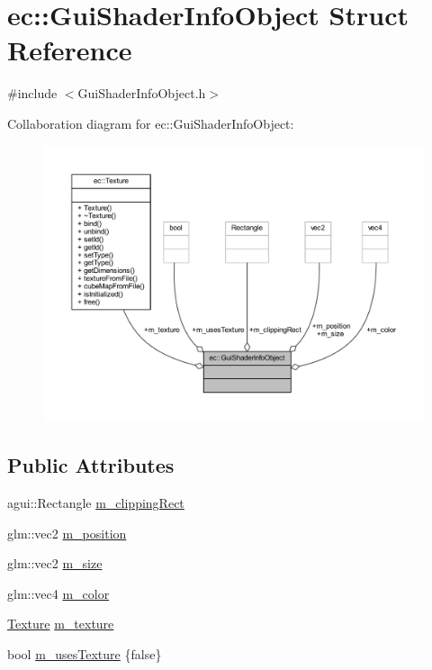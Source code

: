 \hypertarget{structec_1_1_gui_shader_info_object}{}\section{ec\+:\+:Gui\+Shader\+Info\+Object Struct Reference}
\label{structec_1_1_gui_shader_info_object}


{\ttfamily \#include $<$Gui\+Shader\+Info\+Object.\+h$>$}



Collaboration diagram for ec\+:\+:Gui\+Shader\+Info\+Object\+:\nopagebreak
\begin{figure}[H]
\begin{center}
\leavevmode
\includegraphics[width=350pt]{structec_1_1_gui_shader_info_object__coll__graph}
\end{center}
\end{figure}
\subsection*{Public Attributes}
\begin{DoxyCompactItemize}
\item 
agui\+::\+Rectangle \mbox{\hyperlink{structec_1_1_gui_shader_info_object_ab24686318cc8ad087ab9bc5340ed2039}{m\+\_\+clipping\+Rect}}
\item 
glm\+::vec2 \mbox{\hyperlink{structec_1_1_gui_shader_info_object_afff54f995320a1595bd59a68b98a8b4d}{m\+\_\+position}}
\item 
glm\+::vec2 \mbox{\hyperlink{structec_1_1_gui_shader_info_object_ac0d60eba17cc5202cb3a437ccec71926}{m\+\_\+size}}
\item 
glm\+::vec4 \mbox{\hyperlink{structec_1_1_gui_shader_info_object_adad3efd30731997e995a57b980c31bfb}{m\+\_\+color}}
\item 
\mbox{\hyperlink{classec_1_1_texture}{Texture}} \mbox{\hyperlink{structec_1_1_gui_shader_info_object_a80f6058638a7da161d3f30cdb771355c}{m\+\_\+texture}}
\item 
bool \mbox{\hyperlink{structec_1_1_gui_shader_info_object_af9f670fe1830664d40f9f9349be47ac5}{m\+\_\+uses\+Texture}} \{false\}
\end{DoxyCompactItemize}


